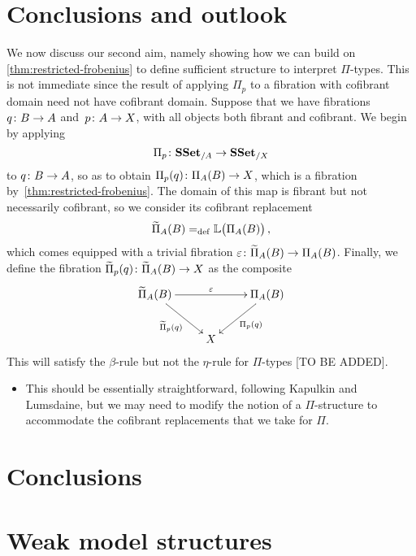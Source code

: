 \documentclass[reqno,10pt,a4paper,oneside,draft]{amsart}
\begin{document}
\newpage

\section{Conclusions and outlook}
\label{sec:conout}

We now discuss our second aim, namely showing how we can build on \cref{thm:restricted-frobenius} 
to define sufficient structure to interpret $\Pi$-types. This is not immediate since the result of applying $\Pi_p$ to a 
fibration with cofibrant domain need not have cofibrant domain.
 Suppose that we have fibrations 
$q \colon B \to A$ and~$p \colon A \to X$, with
all objects both fibrant and cofibrant. 
We begin by applying 
\[
\Pi_p  \colon \mathbf{SSet}_{/A} \to \mathbf{SSet}_{/X}
\]
to $q \colon B \to A$, so as to obtain $\Pi_p(q) \colon \Pi_A(B) \to X$, which is
a fibration by~\cref{thm:restricted-frobenius}. The domain of this map is fibrant but
not necessarily cofibrant, so we consider its cofibrant replacement 
\[
\widetilde{\Pi}_A(B) =_{\operatorname{def}} \mathbb{L} \big( \Pi_A(B)  \big) \, ,
\]
which comes equipped with a trivial fibration $\varepsilon \colon \widetilde{\Pi}_A(B) \to \Pi_A(B)$.
Finally, we define the fibration $\widetilde{\Pi}_p(q) \colon \widetilde{\Pi}_A(B) \to X$ as 
 the composite
 \[
\xymatrix{
\widetilde{\Pi}_A(B) \ar[rr]^{\varepsilon} \ar[dr]_{\widetilde{\Pi}_p(q) } & & \Pi_A(B) \ar[dl]^{\Pi_p(q)}  \\
 & X &} 
 \]
This will satisfy the $\beta$-rule but not the $\eta$-rule for $\Pi$-types [TO BE ADDED].




\begin{itemize}
\item This should be essentially straightforward, following Kapulkin and Lumsdaine, but we may need to modify the notion of a $\Pi$-structure to accommodate the cofibrant replacements that we take for $\Pi$.
\end{itemize}

\section{Conclusions} 
\label{sec:conclusions}


\appendix

\section{Weak model structures} 


\nocite{*}







\end{document}
